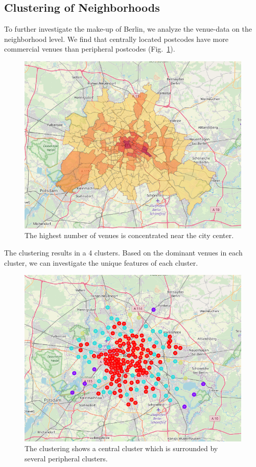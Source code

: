 \documentclass[letter]{scrartcl}
\begin{document}
\subsection{Clustering of Neighborhoods}

To further investigate the make-up of Berlin, we analyze the venue-data on the neighborhood level. We find that centrally located postcodes have more commercial venues than peripheral postcodes (Fig.~\ref{fig:VenuesPLZ}). 
 
\begin{figure}[h!]
\centering
\includegraphics[width=12cm]{../Figures/VenuesMap.PNG}
\caption{The highest number of venues is concentrated near the city center.}\label{fig:VenuesPLZ}
\end{figure}

\clearpage

The clustering results in a 4 clusters. Based on the dominant venues in each cluster, we can investigate the unique features of each cluster.  

\begin{figure}[h!]
\centering
\includegraphics[width=12cm]{../Figures/Clusters.PNG}
\caption{The clustering shows a central cluster which is surrounded by several peripheral clusters.}\label{fig:clusters}
\end{figure}
\end{document}
